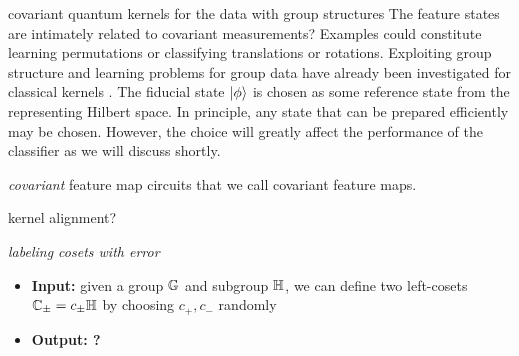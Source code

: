 covariant quantum kernels for the data with group structures
\cite{glickCovariantQuantumKernels2021}
The feature states are intimately related to covariant measurements?
Examples could constitute learning permutations or classifying translations or rotations. Exploiting group structure and learning problems for group data have already been investigated for classical kernels \cite{kondorGraphletSpectrum2009}.
The fiducial state $\ket{\phi}$ is chosen as some reference state from the representing Hilbert space. 
In principle, any state that can be prepared efficiently may be chosen. 
However, the choice will greatly affect the performance of the classifier as we will discuss shortly.
\begin{definition}[Covariant]\label{def:covariant}
	\emph{covariant}
	feature map circuits that we call covariant feature maps. 
\end{definition}
kernel alignment?
\begin{problem}
	\emph{labeling cosets with error}

	\begin{itemize}
		\item 
		\textbf{Input:} given a group $\mathbb{G}$ and subgroup $\mathbb{H}$,
		we can define two left-cosets $\mathbb{C}_{\pm}=c_{\pm}\mathbb{H}$ by choosing $c_+,c_-$ randomly

		\item 
		\textbf{Output: ?} 
	\end{itemize}

\end{problem}

